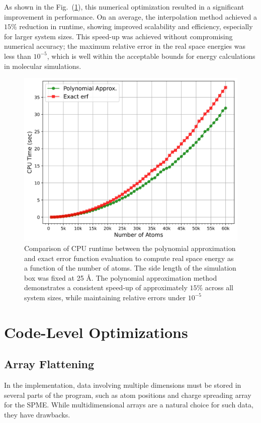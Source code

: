 As shown in the Fig.~(\ref{fig:realspaceopt}), this numerical optimization resulted in a significant improvement in performance. On an average, the interpolation method achieved a $15\%$ reduction in runtime, showing improved scalability and efficiency, especially for larger system sizes. This speed-up was achieved without compromising numerical accuracy; the maximum relative error in the real space energies was less than $10^{-5}$, which is well within the acceptable bounds for energy calculations in molecular simulations.
\begin{figure}[H]
    \centering
    \includegraphics[width=0.75\linewidth]{images/realspaceopt.jpg}
    \caption{Comparison of CPU runtime between the polynomial approximation and exact error function evaluation to compute real space energy as a function of the number of atoms. The side length of the simulation box was fixed at 25 \AA. The polynomial approximation method demonstrates a consistent speed-up of approximately $15\%$ across all system sizes, while maintaining relative errors under $10^{-5}$}
    \label{fig:realspaceopt}
\end{figure}

\section{Code-Level Optimizations}
\subsection{Array Flattening}
In the implementation, data involving multiple dimensions must be stored in several parts of the program, such as atom positions and charge spreading array for the SPME. While multidimensional arrays are a natural choice for such data, they have drawbacks. 

